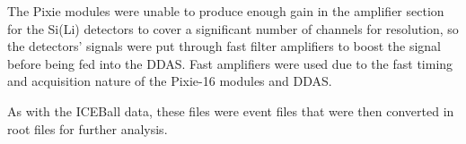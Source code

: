

The Pixie modules were unable to produce enough gain in the amplifier section for the Si(Li) detectors to cover a significant number of channels for resolution, so the detectors' signals were put through fast filter amplifiers \citep{ortec:_fastamp} to boost the signal before being fed into the DDAS. Fast amplifiers were used due to the fast timing and acquisition nature of the Pixie-16 modules and DDAS. 

As with the ICEBall data, these files were event files that were then converted in root files for further analysis.

